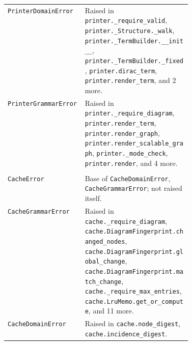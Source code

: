 {\begin{xltabular}{\linewidth}{@{}>{\raggedright\arraybackslash}p{0.42\linewidth}X@{}}
\texttt{PrinterDomainError}\newline{} & Raised in \texttt{printer.\allowbreak{}\_\allowbreak{}require\_\allowbreak{}valid}, \texttt{printer.\allowbreak{}\_\allowbreak{}Structure.\allowbreak{}\_\allowbreak{}walk}, \texttt{printer.\allowbreak{}\_\allowbreak{}TermBuilder.\allowbreak{}\_\allowbreak{}\_\allowbreak{}init\_\allowbreak{}\_\allowbreak{}}, \texttt{printer.\allowbreak{}\_\allowbreak{}TermBuilder.\allowbreak{}\_\allowbreak{}fixed}, \texttt{printer.\allowbreak{}dirac\_\allowbreak{}term}, \texttt{printer.\allowbreak{}render\_\allowbreak{}term}, and 2 more. \\
\texttt{PrinterGrammarError}\newline{} & Raised in \texttt{printer.\allowbreak{}\_\allowbreak{}require\_\allowbreak{}diagram}, \texttt{printer.\allowbreak{}render\_\allowbreak{}term}, \texttt{printer.\allowbreak{}render\_\allowbreak{}graph}, \texttt{printer.\allowbreak{}render\_\allowbreak{}scalable\_\allowbreak{}graph}, \texttt{printer.\allowbreak{}\_\allowbreak{}mode\_\allowbreak{}check}, \texttt{printer.\allowbreak{}render}, and 4 more. \\
\midrule
{}\\*
\texttt{CacheError}\newline{} & Base of \texttt{CacheDomainError}, \texttt{CacheGrammarError}; not raised itself. \\
\texttt{CacheGrammarError}\newline{} & Raised in \texttt{cache.\allowbreak{}\_\allowbreak{}require\_\allowbreak{}diagram}, \texttt{cache.\allowbreak{}DiagramFingerprint.\allowbreak{}changed\_\allowbreak{}nodes}, \texttt{cache.\allowbreak{}DiagramFingerprint.\allowbreak{}global\_\allowbreak{}change}, \texttt{cache.\allowbreak{}DiagramFingerprint.\allowbreak{}match\_\allowbreak{}change}, \texttt{cache.\allowbreak{}\_\allowbreak{}require\_\allowbreak{}max\_\allowbreak{}entries}, \texttt{cache.\allowbreak{}LruMemo.\allowbreak{}get\_\allowbreak{}or\_\allowbreak{}compute}, and 11 more. \\
\texttt{CacheDomainError}\newline{} & Raised in \texttt{cache.\allowbreak{}node\_\allowbreak{}digest}, \texttt{cache.\allowbreak{}incidence\_\allowbreak{}digest}. \\

\end{xltabular}}
